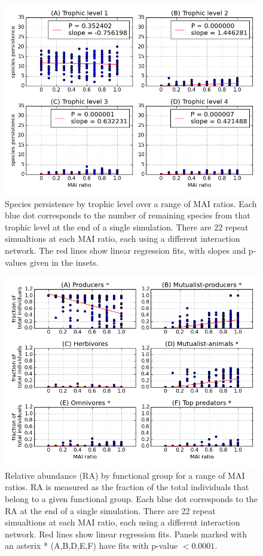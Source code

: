 \begin{figure}
	\centering
	\includegraphics[width=1.0\linewidth]{"figures/species_richness_per_trophic_level"}
	\caption{Species persistence by trophic level over a range of MAI ratios. Each blue dot corresponds to the number of remaining species from that trophic level at the end of a single simulation. There are 22 repeat simualtions at each MAI ratio, each using a different interaction network. The red lines show linear regression fits, with slopes and p-values given in the insets.}
	\label{fig:mvp_species_per_tl}
\end{figure}

\begin{figure}
	\centering
	\includegraphics[width=1.0\linewidth]{"figures/proportion_per_functional_group"}
	\caption{Relative abundance (RA) by functional group for a range of MAI ratios. RA is measured as the fraction of the total individuals that belong to a given functional group. Each blue dot corresponds to the RA at the end of a single simulation. There are 22 repeat simualtions at each MAI ratio, each using a different interaction network. Red lines show linear regression fits. Panels marked with an asterix * (A,B,D,E,F) have fits with p-value $< 0.0001$.}
	\label{fig:mvp_prop_per_fg}
\end{figure}

